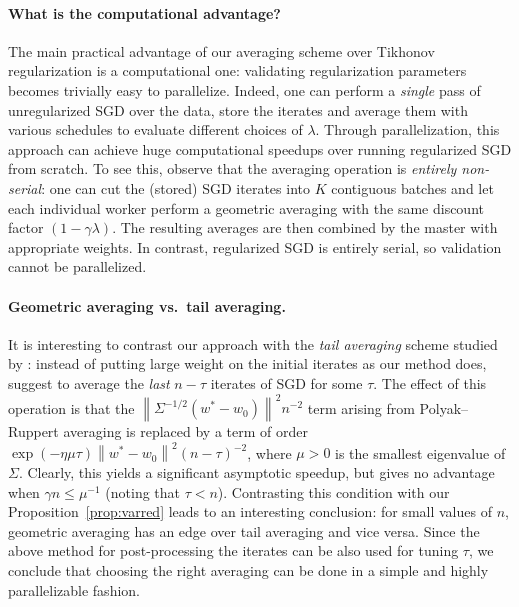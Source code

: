\documentclass[final,12pt]{colt2018} %
\newcommand{\norm}[1]{\left\|#1\right\|}
\newcommand{\pa}[1]{\left(#1\right)}
\begin{document}
\paragraph{What is the computational advantage?}
The main practical  advantage of our averaging scheme over Tikhonov regularization is a computational one: validating regularization 
parameters  becomes trivially easy to parallelize. Indeed, one can perform a \emph{single} pass of unregularized SGD over the data, store 
the iterates 
and average them with various schedules to evaluate different choices of $\lambda$. Through parallelization, this 
approach can achieve huge computational speedups over running regularized SGD from scratch. To see this, observe that the averaging 
operation is \emph{entirely non-serial}: one can cut the (stored) SGD iterates into $K$ contiguous batches and let each individual worker 
perform a geometric averaging with the same discount factor $(1-\gamma \lambda)$. The resulting averages are then combined 
by 
the master with appropriate weights. In contrast, regularized SGD is entirely serial, so validation cannot be parallelized.


\paragraph{Geometric averaging vs.~tail averaging.}
It is interesting to contrast our approach with the \emph{tail averaging} scheme studied by \citet{JKKNS16,JKKNPS17}: instead of putting 
large weight on the initial iterates as our method does, \citeauthor{JKKNPS17} suggest to average the \emph{last} $n-\tau$ iterates of SGD 
for some $\tau$. 
The effect of this operation is that the $\norm{\Sigma^{-1/2}\pa{w^*-w_0}}^2n^{-2}$ term arising from Polyak--Ruppert averaging is 
replaced by a term of order $\exp(-\eta \mu \tau)\norm{w^*-w_0}^2 \pa{n-\tau}^{-2}$, where $\mu>0$ is the smallest eigenvalue of $\Sigma$. 
Clearly, this 
yields a significant asymptotic speedup, but gives no advantage when $\gamma n \le \mu^{-1}$ (noting that $\tau<n$). Contrasting this 
condition with our Proposition~\ref{prop:varred} leads to an interesting conclusion: for small values of $n$, geometric averaging has an 
edge over tail averaging and vice versa. Since the above method for post-processing the iterates can be also used for 
tuning $\tau$, we conclude that choosing the right averaging can be done in a simple and highly parallelizable fashion.
\end{document}

